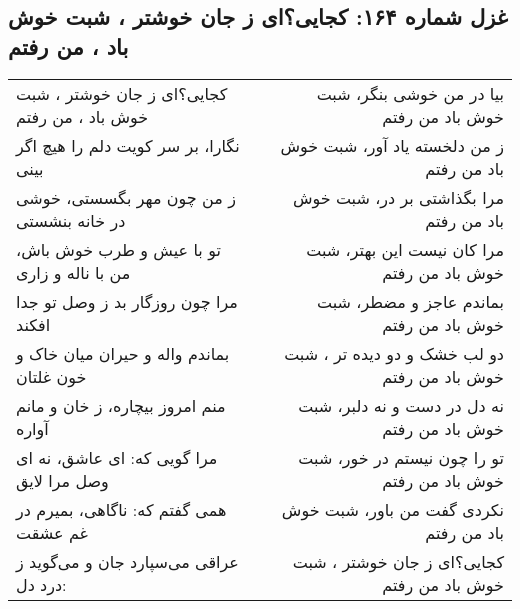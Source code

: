 \begin{center}
\section*{غزل شماره ۱۶۴: کجایی؟ای ز جان خوشتر ، شبت خوش باد ، من رفتم}
\label{sec:164}
\begin{longtable}{l p{0.5cm} r}
کجایی؟ای ز جان خوشتر ، شبت خوش باد ، من رفتم
&&
بیا در من خوشی بنگر، شبت خوش باد من رفتم
\\
نگارا، بر سر کویت دلم را هیچ اگر بینی
&&
ز من دلخسته یاد آور، شبت خوش باد من رفتم
\\
ز من چون مهر بگسستی، خوشی در خانه بنشستی
&&
مرا بگذاشتی بر در، شبت خوش باد من رفتم
\\
تو با عیش و طرب خوش باش، من با ناله و زاری
&&
مرا کان نیست این بهتر، شبت خوش باد من رفتم
\\
مرا چون روزگار بد ز وصل تو جدا افکند
&&
بماندم عاجز و مضطر، شبت خوش باد من رفتم
\\
بماندم واله و حیران میان خاک و خون غلتان
&&
دو لب خشک و دو دیده تر ، شبت خوش باد من رفتم
\\
منم امروز بیچاره، ز خان و مانم آواره
&&
نه دل در دست و نه دلبر، شبت خوش باد من رفتم
\\
مرا گویی که: ای عاشق، نه ای وصل مرا لایق
&&
تو را چون نیستم در خور، شبت خوش باد من رفتم
\\
همی گفتم که: ناگاهی، بمیرم در غم عشقت
&&
نکردی گفت من باور، شبت خوش باد من رفتم
\\
عراقی می‌سپارد جان و می‌گوید ز درد دل:
&&
کجایی؟ای ز جان خوشتر ، شبت خوش باد من رفتم
\\
\end{longtable}
\end{center}
